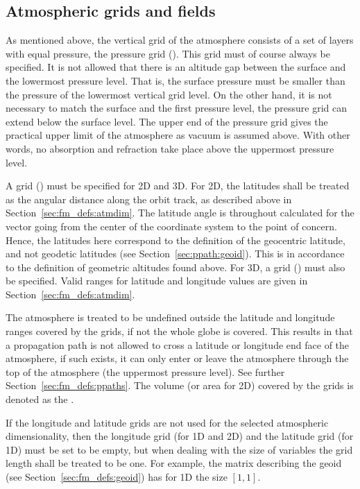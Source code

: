 \subsection{Atmospheric grids and fields}
\label{sec:fm_defs:grids}

As mentioned above, the vertical grid of the atmosphere consists of a
set of layers with equal pressure, the pressure grid
().  This grid must of course always be specified.
It is not allowed that there is an altitude gap between the surface and
the lowermost pressure level.  That is, the surface pressure must be
smaller than the pressure of the lowermost vertical grid level. On
the other hand, it is not necessary to match the surface and the first
pressure level, the pressure grid can extend below the surface level.
The upper end of the pressure grid gives the practical upper limit of
the atmosphere as vacuum is assumed above. With other words, no
absorption and refraction take place above the uppermost pressure
level.

A  grid () must be specified
for 2D and 3D.  For 2D, the latitudes shall be treated as the angular
distance along the orbit track, as described above in
Section~\ref{sec:fm_defs:atmdim}.  The latitude angle is throughout
calculated for the vector going from the center of the coordinate
system to the point of concern. Hence, the latitudes here correspond
to the definition of the geocentric latitude, and not geodetic
latitudes (see Section~\ref{sec:ppath:geoid}). This is in accordance
to the definition of geometric altitudes found above.  For 3D, a
 grid () must also be specified.
Valid ranges for latitude and longitude values are given in
Section~\ref{sec:fm_defs:atmdim}.

The atmosphere is treated to be undefined outside the latitude and
longitude ranges covered by the grids, if not the whole globe is
covered. This results in that a propagation path is not allowed to
cross a latitude or longitude end face of the atmosphere, if such
exists, it can only enter or leave the atmosphere through the top of
the atmosphere (the uppermost pressure level). See further
Section~\ref{sec:fm_defs:ppaths}. The volume (or area for 2D) covered
by the grids is denoted as the .

If the longitude and latitude grids are not used for the selected
atmospheric dimensionality, then the longitude grid (for 1D and 2D)
and the latitude grid (for 1D) must be set to be empty, but when
dealing with the size of variables the grid length shall be treated to
be one. For example, the matrix describing the geoid (see
Section~\ref{sec:fm_defs:geoid}) has for 1D the size $[1,1]$.

